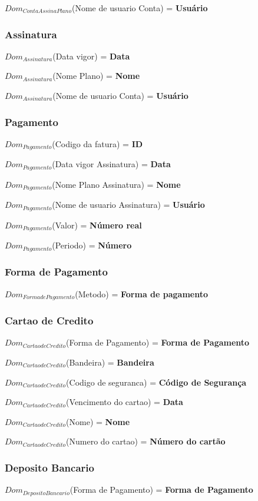 \documentclass[12pt,a4paper]{article}
\newcommand{\createdomain}[3]{
    $Dom_{#1}$(#2) = {\bf #3}
}
\begin{document}
        \createdomain{Conta Assina Plano}{Nome de usuario Conta}{Usuário}


    \subsubsection{Assinatura}
        \createdomain{Assinatura}{Data vigor}{Data}

        \createdomain{Assinatura}{Nome Plano}{Nome}

        \createdomain{Assinatura}{Nome de usuario Conta}{Usuário}


    \subsubsection{Pagamento}
        \createdomain{Pagamento}{Codigo da fatura}{ID}

        \createdomain{Pagamento}{Data vigor Assinatura}{Data}

        \createdomain{Pagamento}{Nome Plano Assinatura}{Nome}

        \createdomain{Pagamento}{Nome de usuario Assinatura}{Usuário}

        \createdomain{Pagamento}{Valor}{Número real}

        \createdomain{Pagamento}{Periodo}{Número}


    \subsubsection{Forma de Pagamento}
        \createdomain{Forma de Pagamento}{Metodo}{Forma de pagamento}


    \subsubsection{Cartao de Credito}
        \createdomain{Cartao de Credito}{Forma de Pagamento}{Forma de Pagamento}

        \createdomain{Cartao de Credito}{Bandeira}{Bandeira}

        \createdomain{Cartao de Credito}{Codigo de seguranca}{Código de Segurança}

        \createdomain{Cartao de Credito}{Vencimento do cartao}{Data}

        \createdomain{Cartao de Credito}{Nome}{Nome}

        \createdomain{Cartao de Credito}{Numero do cartao}{Número do cartão}


    \subsubsection{Deposito Bancario}
        \createdomain{Deposito Bancario}{Forma de Pagamento}{Forma de Pagamento}
\end{document}
